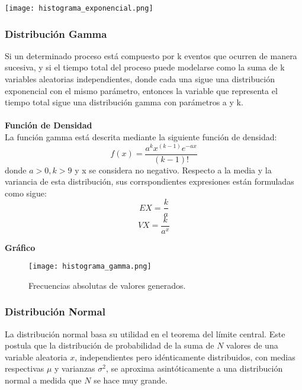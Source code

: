 \documentclass[11pt]{article}
\begin{document}
\begin{center}
\texttt{[image: histograma\_exponencial.png]}
\end{center}



\subsubsection{Distribución Gamma}
Si un determinado proceso está compuesto por k eventos que ocurren de manera sucesiva, y si el tiempo total del proceso puede modelarse como la suma de k variables aleatorias independientes, donde cada una sigue una distribución exponencial con el mismo parámetro, entonces la variable que representa el tiempo total sigue una distribución gamma con parámetros a y k. \\
\\
\noindent\textbf{Función de Densidad}\\
La función gamma está descrita mediante la siguiente función de densidad:
  \begin{equation}
    f(x) = \frac{a^{k}x^{(k-1)}e^{-ax}}{(k-1)!}
  \end{equation}
  donde $a > 0  ,  k > 9$ y x se considera no negativo.
  Respecto a la media y la variancia de esta distribución, sus corrspondientes expresiones están formuladas como sigue:
  \begin{equation}
    EX = \frac{k}{a}
  \end{equation}
  \begin{equation}
    VX = \frac{k}{a^{x}}
  \end{equation}

\newpage
\noindent\textbf{Gráfico}\\
\begin{figure}[h]
    \centering
    \texttt{[image: histograma\_gamma.png]}
    \caption{Frecuencias absolutas de valores generados.}
  \end{figure}

\subsubsection{Distribución Normal}
La distribución normal basa su utilidad en el teorema del límite central. Este postula que la distribución de probabilidad de la suma de \( N \) valores de una variable aleatoria \( x \), independientes pero idénticamente distribuidos, con medias respectivas \( \mu \) y varianzas \( \sigma^2 \), se aproxima asintóticamente a una distribución normal a medida que \( N \) se hace muy grande.
\end{document}

